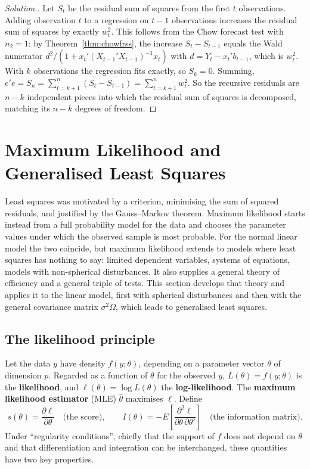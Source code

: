 \documentclass[11pt,a4paper]{article}
\numberwithin{equation}{section}
\theoremstyle{definition}
\newenvironment{solution}
  {\renewcommand{\qedsymbol}{}\begin{proof}[\textit{Solution}.]}
  {\end{proof}}
\begin{document}
\begin{solution}
Let $S_t$ be the residual sum of squares from the first $t$ observations. Adding observation $t$ to a regression on $t - 1$ observations increases the
residual sum of squares by exactly $w_t^2$. This follows from the Chow forecast test with $n_2 = 1$: by Theorem~\ref{thm:chowfrss}, the increase $S_t - S_{t-1}$
equals the Wald numerator $d^2/(1 + x_t'(X_{t-1}'X_{t-1})^{-1}x_t)$ with $d = Y_t - x_t'b_{t-1}$, which is $w_t^2$. With $k$ observations the regression fits exactly,
so $S_k = 0$. Summing, $e'e = S_n = \sum_{t=k+1}^n (S_t - S_{t-1}) = \sum_{t=k+1}^n w_t^2$. So the recursive residuals are $n - k$ independent pieces into which the residual
sum of squares is decomposed, matching its $n - k$ degrees of freedom.
\end{solution}

\section{Maximum Likelihood and Generalised Least Squares}
\label{sec:ml}

Least squares was motivated by a criterion, minimising the sum of squared residuals, and justified by the Gauss--Markov theorem. Maximum
likelihood starts instead from a full probability model for the data and chooses the parameter values under which the observed sample is most
probable. For the normal linear model the two coincide, but maximum likelihood extends to models where least squares has nothing to say:
limited dependent variables, systems of equations, models with non-spherical disturbances. It also supplies a general theory of efficiency and a
general triple of tests. This section develops that theory and applies it to the linear model, first with spherical disturbances and then with
the general covariance matrix $\sigma^2\Omega$, which leads to generalised least squares.

\subsection{The likelihood principle}
\label{ssec:likelihood}

Let the data $y$ have density $f(y; \theta)$, depending on a parameter vector $\theta$ of dimension $p$. Regarded as a function of $\theta$ for the observed
$y$, $L(\theta) = f(y; \theta)$ is the \textbf{likelihood}, and $\ell(\theta) = \log L(\theta)$ the \textbf{log-likelihood}. The \textbf{maximum likelihood estimator}
(MLE) $\hat\theta$ maximises $\ell$. Define
\[
s(\theta) = \frac{\partial\ell}{\partial\theta} \quad\text{(the score)}, \qquad
I(\theta) = -E\left[\frac{\partial^2\ell}{\partial\theta\,\partial\theta'}\right] \quad\text{(the information matrix)} .
\]
Under ``regularity conditions'', chiefly that the support of $f$ does not depend on $\theta$ and that differentiation and integration can be
interchanged, these quantities have two key properties.
\end{document}
